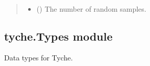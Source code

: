 \documentclass[letterpaper,10pt,english]{sphinxmanual}
\begin{document}
\begin{fulllineitems}
\begin{fulllineitems}
\begin{quote}
\begin{description}
\begin{itemize}
\item {} 
 () \textendash{} The number of random samples.

\end{itemize}

\end{description}\end{quote}

\end{fulllineitems}


\end{fulllineitems}



\subsection{tyche.Types module}
\label{\detokenize{tyche:module-tyche.Types}}\label{\detokenize{tyche:tyche-types-module}}
Data types for Tyche.
\end{document}
